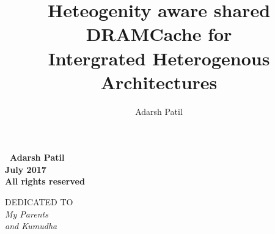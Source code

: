 \documentclass[oneside,12pt]{iiscmastersthesis}
\newcommand{\blankpage}{
\newpage
\thispagestyle{empty}
\mbox{}
\newpage
}
\begin{document}
\title{Heteogenity aware shared DRAMCache for \\ Intergrated Heterogenous Architectures} 

\author{Adarsh Patil}



\maketitle

\newpage

\vspace*{\fill}
\begin{center}
\large\bf \textcopyright \ Adarsh Patil\\
\large\bf July 2017\\
\large\bf All rights reserved
\end{center}
\vspace*{\fill}
\thispagestyle{empty}

\newpage

\vspace*{\fill}
\begin{center}
DEDICATED TO \\[2em]
\Large\it My Parents \\ and Kumudha
\end{center}
\vspace*{\fill}
\thispagestyle{empty}

\blankpage

\end{document}
